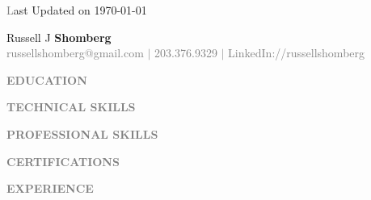\documentclass[10pt]{article}
\begin{document}
\begin{flushright}\fontsize{8pt}{10pt}
  {\textcolor{gray}
Last Updated on
\today
}
\end{flushright}

\begin{center}
{\Huge{Russell J \textbf{Shomberg}}} \\
{\textcolor{gray}
{russellshomberg@gmail.com $\vert$ 203.376.9329 $\vert$ LinkedIn://russellshomberg}\\
}
\end{center}

\begin{minipage}[t]{0.29\textwidth}

{\textcolor{gray}
{\Large  \uppercase{\textbf{Education}} }
}




{\textcolor{gray}
{\Large \uppercase{\textbf{Technical Skills}}}
}



{\textcolor{gray}
{\Large \uppercase{\textbf{Professional Skills}}}
}




\end{minipage}
\hfill
\begin{minipage}[t]{0.65\textwidth}


{\textcolor{gray}
{\Large \uppercase{\textbf{Certifications}}}
}



{\textcolor{gray}
{\Large \uppercase{\textbf{Experience}}}
}





\end{minipage}
\end{document}

